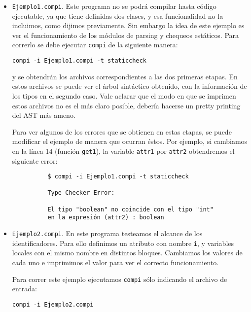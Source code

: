 \documentclass[a4paper,10pt]{article}
\begin{document}
\begin{itemize}
 \item \verb|Ejemplo1.compi|. Este programa no se podrá compilar hasta código ejecutable, ya que tiene definidas dos clases, y esa funcionalidad
		no la incluimos, como dijimos previamente. Sin embargo la idea de este ejemplo es ver el funcionamiento de los módulos de parsing
		y chequeos estáticos. Para correrlo se debe ejecutar \verb|compi| de la siguiente manera:
		
      \begin{center}
       \verb|compi -i Ejemplo1.compi -t staticcheck|
      \end{center}

	  \noindent y se obtendrán los archivos correspondientes a las dos primeras etapas. En estos archivos se puede ver el árbol sintáctico
		    obtenido, con la información de los tipos en el segundo caso. Vale aclarar que el modo en que se imprimen estos archivos
		    no es el más claro posible, debería hacerse un pretty printing del AST más ameno.
		    
		    Para ver algunos de los errores que se obtienen en estas etapas, se puede modificar el ejemplo de manera que 
		    ocurran éstos. Por ejemplo, si cambiamos en la línea 14 (función \verb|get1|), la variable \verb|attr1| por \verb|attr2| obtendremos
		    el siguiente error:
		    
	    \begin{center}
	     \begin{verbatim}
	      $ compi -i Ejemplo1.compi -t staticcheck

	      Type Checker Error:

	      El tipo "boolean" no coincide con el tipo "int" 
	      en la expresión (attr2) : boolean
	     \end{verbatim}

	    \end{center}

  \item \verb|Ejemplo2.compi|. En este programa testeamos el alcance de los identificadores. Para ello definimos un atributo con nombre \verb|i|,
		  y variables locales con el mismo nombre en distintos bloques. Cambiamos los valores de cada uno e imprimimos el valor para ver
		  el correcto funcionamiento.
		  
		  Para correr este ejemplo ejecutamos \verb|compi| sólo indicando el archivo de entrada:
		  
      \begin{center}
	\verb|compi -i Ejemplo2.compi|
      \end{center}
      

\end{itemize}
\end{document}
